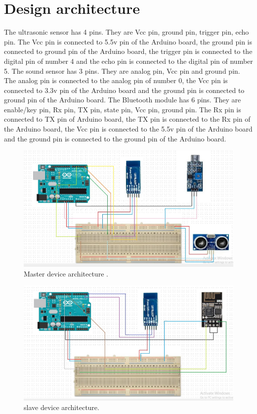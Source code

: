 \section{Design architecture}
The ultrasonic sensor has 4 pins. They are Vcc pin, ground pin, trigger pin, echo pin. The Vcc pin is connected to 5.5v pin of the Arduino board, the ground pin is connected to ground pin of the Arduino board, the trigger pin is connected to the digital pin of number 4 and the echo pin is connected to the digital pin of number 5.
The sound sensor has 3 pins. They are analog pin, Vcc pin and ground pin. The analog pin is connected to the analog pin of number 0, the Vcc pin is connected to 3.3v pin of the Arduino board and the ground pin is connected to ground pin of the Arduino board.
The Bluetooth module has 6 pins. They are enable/key pin, Rx pin, TX pin, state pin, Vcc pin, ground pin. The Rx pin is connected to TX pin of Arduino board, the TX pin is connected to the Rx pin of the Arduino board, the Vcc pin is connected to the 5.5v pin of the Arduino board and the ground pin is connected to the ground pin of the Arduino board.
\begin{figure}[h]
\centerline{\includegraphics[width=5.7in]{master}}
\caption{Master device architecture .}
\end{figure}
\begin{figure}[h]
\centerline{\includegraphics[width=5.7in]{slave}}
\caption{slave device architecture.}
\end{figure}
\clearpage
